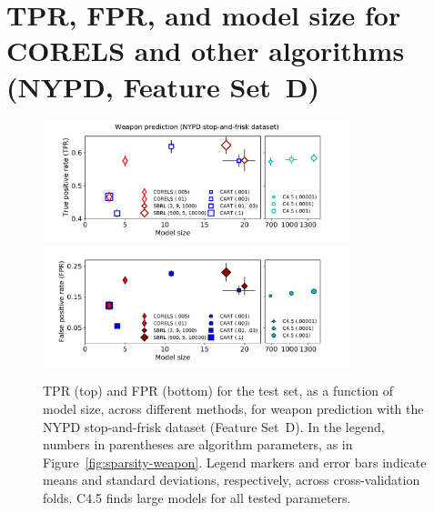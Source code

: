 \clearpage
\section{TPR, FPR, and model size for CORELS and other algorithms (NYPD, Feature Set~D)}
\label{appendix:cpw}

\begin{figure}[b!]
\begin{center}
\includegraphics[trim={17mm, 0mm, 27mm, 0mm},
width=0.8\textwidth]{figs/cpw-noloc-sparsity-tpr.pdf}
\includegraphics[trim={17mm, 10mm, 27mm, 4mm},
width=0.8\textwidth]{figs/cpw-noloc-sparsity-fpr.pdf}
\end{center}
\caption{TPR (top) and FPR (bottom)
for the test set, as a function of model size, across different methods,
for weapon prediction with the NYPD stop-and-frisk dataset (Feature Set~D).
%
In the legend, numbers in parentheses are algorithm parameters,
as in Figure~\ref{fig:sparsity-weapon}.
%
Legend markers and error bars indicate means and standard deviations,
respectively, across cross-validation folds.
%
%
C4.5 finds large models for all tested parameters.
}
\label{fig:sparsity-cpw}
\end{figure}
